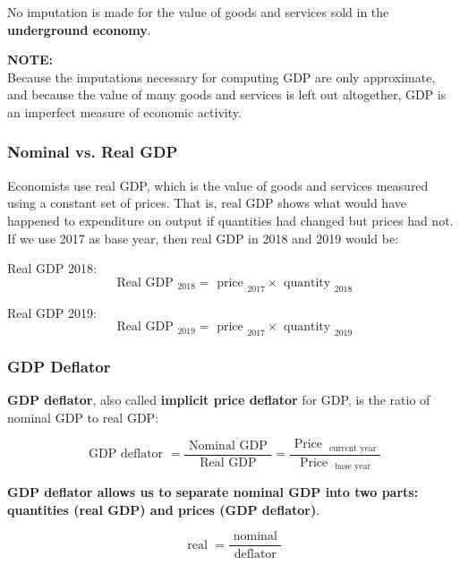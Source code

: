 \documentclass[12pt]{article}
\begin{document}
No imputation is made for the value of goods and services sold in the 
{\textbf {underground economy}}.


{\textbf {NOTE:}}\\
Because the imputations necessary for computing GDP are only approximate, and because the value of many goods and services is left out altogether, GDP is an imperfect measure of economic activity.


\subsubsection{Nominal vs. Real GDP}

Economists use real GDP, which is the value of goods and services measured using a 
constant set of prices. That is, real GDP shows what would have happened to
expenditure on output if quantities had changed but prices had not.\\
If we use 2017 as base year, then real GDP in 2018 and 2019 would be:

Real GDP 2018:
\begin{equation*}
\text{ Real GDP }_{2018} = \text{ price }_{2017}  \times \text{ quantity }_{2018}
\end{equation*}


Real GDP 2019:
\begin{equation*}
\text{ Real GDP }_{2019} = \text{ price }_{2017}  \times \text{ quantity }_{2019}
\end{equation*}



\subsubsection{GDP Deflator}
{\textbf {GDP deflator}}, also called {\textbf {implicit price deflator}} for GDP,
is the ratio of nominal GDP to real GDP:

\begin{equation*}
\text{ GDP deflator } = \frac{\text{ Nominal GDP }}{\text{ Real GDP }} = 
\frac{\text{ Price }_{\text{ current year }}}{\text{ Price }_{\text{ base year }}}
\end{equation*}

{\textbf {GDP deflator allows us to separate nominal GDP into two parts: quantities
(real GDP) and prices (GDP deflator)}}.

\begin{equation*}
\text{ real }  = \frac{\text{ nominal }}{\text{ deflator }}
\end{equation*}
\end{document}
